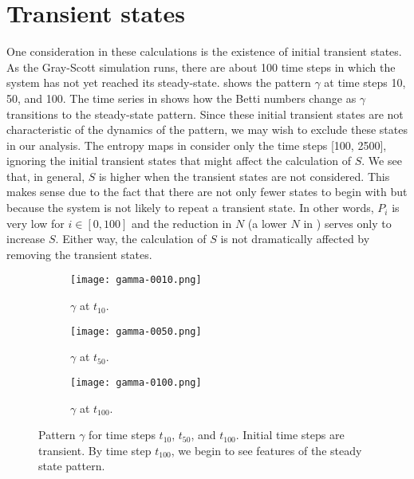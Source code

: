 \section{Transient states}

One consideration in these calculations is the existence of initial transient states. As the Gray-Scott simulation runs, there are about 100 time steps in which the system has not yet reached its steady-state.  shows the pattern $\gamma$ at time steps 10, 50, and 100. The time series in  shows how the Betti numbers change as $\gamma$ transitions to the steady-state pattern. Since these initial transient states are not characteristic of the dynamics of the pattern, we may wish to exclude these states in our analysis. The entropy maps in  consider only the time steps [100, 2500], ignoring the initial transient states that might affect the calculation of $S$. We see that, in general, $S$ is higher when the transient states are not considered. This makes sense due to the fact that there are not only fewer states to begin with but because the system is not likely to repeat a transient state. In other words, $P_i$ is very low for $i \in [0, 100]$ and the reduction in $N$ (a lower $N$ in ) serves only to increase $S$. Either way, the calculation of $S$ is not dramatically affected by removing the transient states.

\begin{figure}
	\centering
	\begin{subfigure}[b]{0.3\textwidth}
		\texttt{[image: gamma-0010.png]}
		\caption{$\gamma$ at $t_{10}$.} \label{fig:gamma-0010}
	\end{subfigure} \quad
	\begin{subfigure}[b]{0.3\textwidth}
		\texttt{[image: gamma-0050.png]}
		\caption{$\gamma$ at $t_{50}$.} \label{fig:gamma-0050}
	\end{subfigure} \quad
	\begin{subfigure}[b]{0.3\textwidth}
		\texttt{[image: gamma-0100.png]}
		\caption{$\gamma$ at $t_{100}$.} \label{fig:gamma-0100}
	\end{subfigure}
	\caption{Pattern $\gamma$ for time steps $t_{10}$, $t_{50}$, and $t_{100}$. Initial time steps are transient. By time step $t_{100}$, we begin to see features of the steady state pattern.}
	\label{fig:gamma_transients}
\end{figure}

